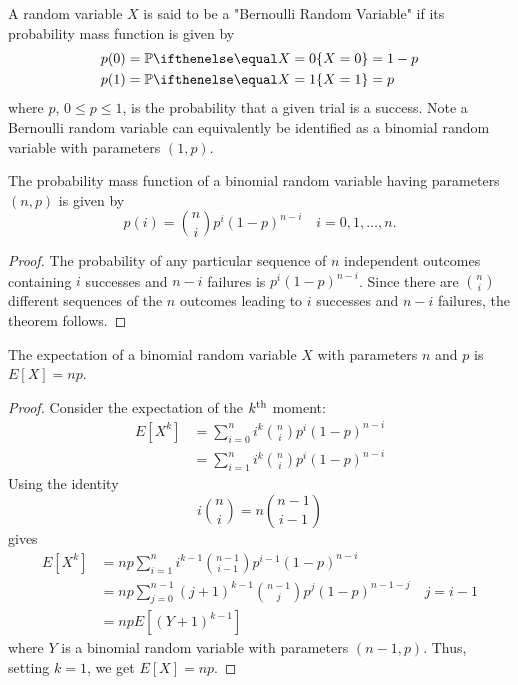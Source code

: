 \documentclass[a4paper,11pt]{article}
\begin{document}
\begin{outline}
    A random variable \(X\) is said to be a "Bernoulli Random Variable" if its probability mass function is given by 
    \begin{align*}
      p(0) &= \bbp[X=0] = 1 - p \\
      p(1) &= \bbp[X=1] = p
    \end{align*}
    where \(p\), \(0 \leq p \leq 1\), is the probability that a given trial is a success. Note a Bernoulli random 
    variable can equivalently be identified as a binomial random variable with parameters \((1, p)\).
    
    The probability mass function of a binomial random variable having parameters \((n, p)\) is given by 
    \[ p(i) = \binom{n}{i}p^i(1-p)^{n-i}\quad i=0,1,\ldots,n\text{.} \]
    
    \begin{proof}
      The probability of any particular sequence of \(n\) independent outcomes containing \(i\) successes and 
      \(n-i\) failures is \(p^i(1-p)^{n-i}\). Since there are \(\binom{n}{i}\) different sequences of the \(n\) 
      outcomes leading to \(i\) successes and \(n-i\) failures, the theorem follows.
    \end{proof}
    
    The expectation of a binomial random variable \(X\) with parameters \(n\) and \(p\) is \(E[X] = np\).
    
    \begin{proof}
      Consider the expectation of the \(k\textsuperscript{th}\) moment:
      \begin{align*}
        E[X^k] &= \sum_{i=0}^ni^k\binom{n}{i}p^i(1-p)^{n-i} \\
               &= \sum_{i=1}^ni^k\binom{n}{i}p^i(1-p)^{n-i}
      \end{align*}
      Using the identity \[ i\binom{n}{i} = n\binom{n-1}{i-1}\] gives
      \begin{align*}
        E[X^k] &= np\sum_{i=1}^ni^{k-1}\binom{n-1}{i-1}p^{i-1}(1-p)^{n-i} \\
               &= np\sum_{j=0}^{n-1}(j+1)^{k-1}\binom{n-1}{j}p^j(1-p)^{n-1-j}\quad j=i-1 \\
               &= npE[(Y+1)^{k-1}]
      \end{align*}
      where \(Y\) is a binomial random variable with parameters \((n-1, p)\). Thus, 
      setting \(k=1\), we get \(E[X] = np\).
    \end{proof}
    

\end{outline}
\end{document}
